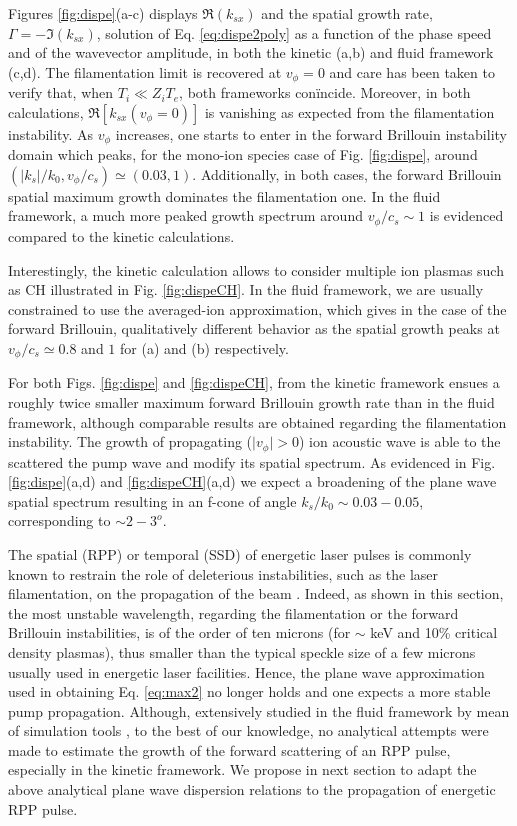 \documentclass[
 reprint,
 amsmath,amssymb,
 aps,
]{revtex4-1}
\begin{document}
Figures \ref{fig:dispe}(a-c) displays  $\Re(k_{sx})$ and the spatial growth rate,  $\Gamma=-\Im(k_{sx})$, solution of Eq. \eqref{eq:dispe2poly} as a function of the phase speed and of the wavevector amplitude, in both the kinetic (a,b) and fluid framework (c,d). The filamentation limit is recovered at $v_\phi=0$ and care has been taken to verify that, when $T_i\ll Z_iT_e$, both frameworks con\"incide. Moreover, in both calculations, $\Re[k_{sx}(v_\phi=0)]$ is vanishing as expected from the filamentation instability. As $v_\phi$ increases, one starts to enter in the forward Brillouin instability domain which peaks, for the mono-ion species case of Fig. \ref{fig:dispe}, around $(\vert k_s\vert/k_0, v_\phi/c_s) \simeq(0.03,1)$. Additionally, in both cases, the forward Brillouin spatial maximum  growth dominates the filamentation one. In the fluid framework, a much more peaked growth spectrum around  $ v_\phi/c_s\sim 1 $ is evidenced compared to the kinetic calculations. 

Interestingly, the kinetic calculation allows to consider multiple ion plasmas such as CH  illustrated in Fig. \ref{fig:dispeCH}. In the fluid framework, we are usually constrained to use the averaged-ion approximation, which gives in the case of the forward Brillouin, qualitatively different behavior as the spatial growth peaks at $v_\phi/c_s \simeq 0.8$ and $1$ for (a) and (b) respectively. 

For both Figs. \ref{fig:dispe} and \ref{fig:dispeCH},   from the kinetic framework ensues a  roughly twice smaller maximum forward Brillouin growth rate than in the fluid framework, although comparable results are obtained regarding the filamentation instability. 
The growth of propagating ($\vert v_\phi\vert >0$) ion acoustic wave   is able to the scattered the pump wave and modify its spatial spectrum. As evidenced in Fig. \ref{fig:dispe}(a,d) and \ref{fig:dispeCH}(a,d) we expect a broadening of the plane wave spatial spectrum  resulting in an f-cone   of angle $k_s/k_0\sim 0.03-0.05$, corresponding to $\sim 2-3^o$.  

The spatial (RPP) or temporal (SSD) of energetic laser pulses is commonly known to restrain the role of deleterious instabilities, such as the laser filamentation, on the propagation of the beam \cite[]{Kato_1984,NatPhys_Glenzer}. Indeed, as shown in this section, the most unstable wavelength, regarding the filamentation or the forward Brillouin instabilities, is of the order of ten   microns (for $\sim$ keV and 10\% critical density plasmas), thus smaller than the typical  speckle size   of a few microns   usually used in energetic laser facilities.  
Hence, the plane wave approximation used in obtaining Eq. \eqref{eq:max2} no longer holds and one expects a more stable pump propagation.
Although, extensively studied in the fluid framework by mean of simulation tools \cite[]{}, to the best of our knowledge, no analytical attempts were made to estimate the growth of the forward scattering of an RPP pulse, especially in the kinetic framework. 
We propose in next section to adapt the above analytical plane wave dispersion relations  to the propagation of energetic RPP pulse.
\end{document}
